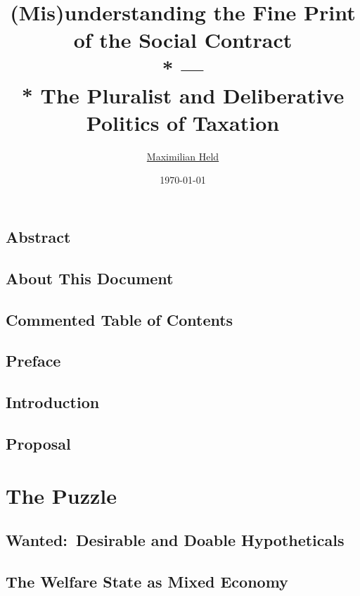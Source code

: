 \documentclass[11pt,a4paper,openright,oneside,titlepage]{book}
\title{
	(Mis)understanding the Fine Print of the Social Contract
	\\*
	---
	\\*
	The Pluralist and Deliberative Politics of Taxation
	}
\author{
	\href{http://www.maxheld.de}{Maximilian Held}
}
\date{
	\today
}
\begin{document}
\maketitle
	
\setcounter{page}{3}
\chapter*{Abstract}
	\label{chap:abstract}
	
\chapter*{About This Document}
	\label{chap:how2}
	
\tableofcontents
\listoffigures
\listoftables
\chapter*{Commented Table of Contents}
	\label{chap:commented-toc-phd}
	
\chapter*{Preface}
	\label{chap:preface-phd}
	
\mainmatter
\chapter{Introduction}
	\label{chap:introduction-phd}
	
\chapter{Proposal}
	\label{chap:proposal-phd}
	
\part{The Puzzle}
	\label{part:puzzle}
	\chapter[Wanted]{Wanted:\ Desirable and Doable Hypotheticals}
		\label{chap:wanted}
		
	\chapter[Mixed Economy]{The Welfare State as Mixed Economy}
		\label{chap:mixed-economy}
		
\end{document}
